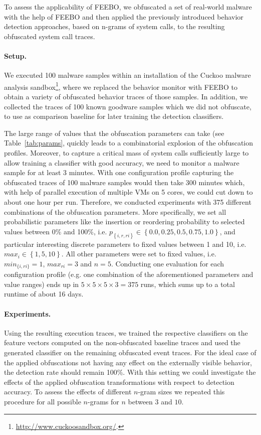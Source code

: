 \documentclass{llncs}
\begin{document}
To assess the applicability of FEEBO, we obfuscated a set of real-world malware with the help of FEEBO and then applied the previously introduced behavior detection approaches, based on n-grams of system calls, to the resulting obfuscated system call traces.

\paragraph{Setup.}
We executed 100 malware samples within an installation of the Cuckoo malware analysis sandbox\footnote{\url{http://www.cuckoosandbox.org/}.}, where we replaced the behavior monitor with FEEBO to obtain a variety of obfuscated behavior traces of those samples. In addition, we collected the traces of 100 known goodware samples which we did not obfuscate, to use as comparison baseline for later training the detection classifiers. 

The large range of values that the obfuscation parameters can take (see Table~\ref{tab:params}, quickly leads to a combinatorial explosion of the obfuscation profiles. Moreover, to capture a critical mass of system calls sufficiently large to allow training a classifier with good accuracy, we need to monitor a malware sample for at least 3 minutes. With one configuration profile capturing the obfuscated traces of 100 malware samples would then take 300 minutes which, with help of parallel execution of multiple VMs on 5 cores, we could cut down to about one hour per run. Therefore, we conducted experiments with 375 different combinations of the obfuscation parameters. More specifically, we set all probabilistic parameters like the insertion or reordering probability to selected values between 0\% and 100\%, i.e. $p_{\left\{i,r,ri\right\}}\in\left\{0.0,0.25,0.5,0.75,1.0\right\}$, and particular interesting discrete parameters to fixed values between 1 and 10, i.e. $max_i\in\left\{1,5,10\right\}$. All other parameters were set to fixed values, i.e.~$min_{\{i,ri\}} = 1$, $max_{ri} = 3$ and $n = 5$. 
Conducting one evaluation for each configuration profile (e.g. one combination of the aforementioned parameters and value ranges) ends up in $5\times5\times5\times3=375$ runs, which sums up to a total runtime of about 16 days. 

\paragraph{Experiments.}
Using the resulting execution traces, we trained the respective classifiers on the feature vectors computed on the non-obfuscated baseline traces and used the generated classifier on the remaining obfuscated event traces. For the ideal case of the applied obfuscations not having any effect on the externally visible behavior, the detection rate should remain 100\%.
With this setting we could investigate the effects of the applied obfuscation transformations with respect to detection accuracy. To assess the effects of different $n$-gram sizes we repeated this procedure for all possible $n$-grams for $n$ between $3$ and $10$.
\end{document}
